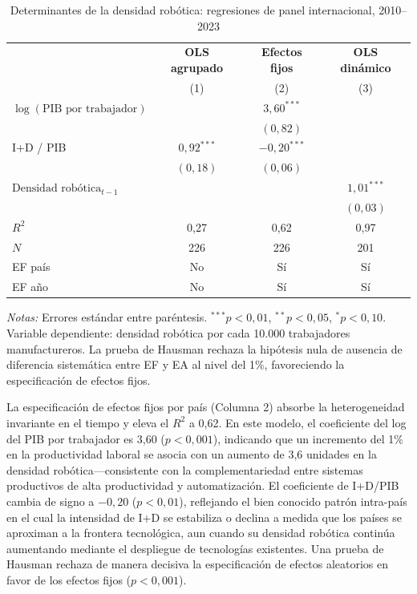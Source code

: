 \documentclass{article}
\begin{document}
\begin{table}[htbp]
\centering
\caption{Determinantes de la densidad rob\'otica: regresiones de panel internacional, 2010--2023}
\label{tab:panel_results}
\begin{threeparttable}
\begin{tabular}{lccc}
\toprule
& \textbf{OLS agrupado} & \textbf{Efectos fijos} & \textbf{OLS din\'amico} \\
& (1) & (2) & (3) \\
\midrule
$\log(\text{PIB por trabajador})$ & & $3{,}60^{***}$ & \\
& & $(0{,}82)$ & \\[4pt]
I+D / PIB & $0{,}92^{***}$ & $-0{,}20^{***}$ & \\
& $(0{,}18)$ & $(0{,}06)$ & \\[4pt]
$\text{Densidad rob\'otica}_{t-1}$ & & & $1{,}01^{***}$ \\
& & & $(0{,}03)$ \\[4pt]
\midrule
$R^2$ & 0,27 & 0,62 & 0,97 \\
$N$ & 226 & 226 & 201 \\
EF pa\'is & No & S\'i & S\'i \\
EF a\~no & No & S\'i & S\'i \\
\bottomrule
\end{tabular}
\begin{tablenotes}
\small
\item \textit{Notas:} Errores est\'andar entre par\'entesis. $^{***}p<0{,}01$, $^{**}p<0{,}05$, $^{*}p<0{,}10$. Variable dependiente: densidad rob\'otica por cada 10.000 trabajadores manufactureros. La prueba de Hausman rechaza la hip\'otesis nula de ausencia de diferencia sistem\'atica entre EF y EA al nivel del 1\%, favoreciendo la especificaci\'on de efectos fijos.
\end{tablenotes}
\end{threeparttable}
\end{table}

La especificaci\'on de efectos fijos por pa\'is (Columna 2) absorbe la heterogeneidad invariante en el tiempo y eleva el $R^2$ a 0,62. En este modelo, el coeficiente del log del PIB por trabajador es 3,60 ($p < 0,001$), indicando que un incremento del 1\% en la productividad laboral se asocia con un aumento de 3,6 unidades en la densidad rob\'otica---consistente con la complementariedad entre sistemas productivos de alta productividad y automatizaci\'on. El coeficiente de I+D/PIB cambia de signo a $-0,20$ ($p < 0,01$), reflejando el bien conocido patr\'on intra-pa\'is en el cual la intensidad de I+D se estabiliza o declina a medida que los pa\'ises se aproximan a la frontera tecnol\'ogica, aun cuando su densidad rob\'otica contin\'ua aumentando mediante el despliegue de tecnolog\'ias existentes. Una prueba de Hausman rechaza de manera decisiva la especificaci\'on de efectos aleatorios en favor de los efectos fijos ($p < 0,001$).
\end{document}
